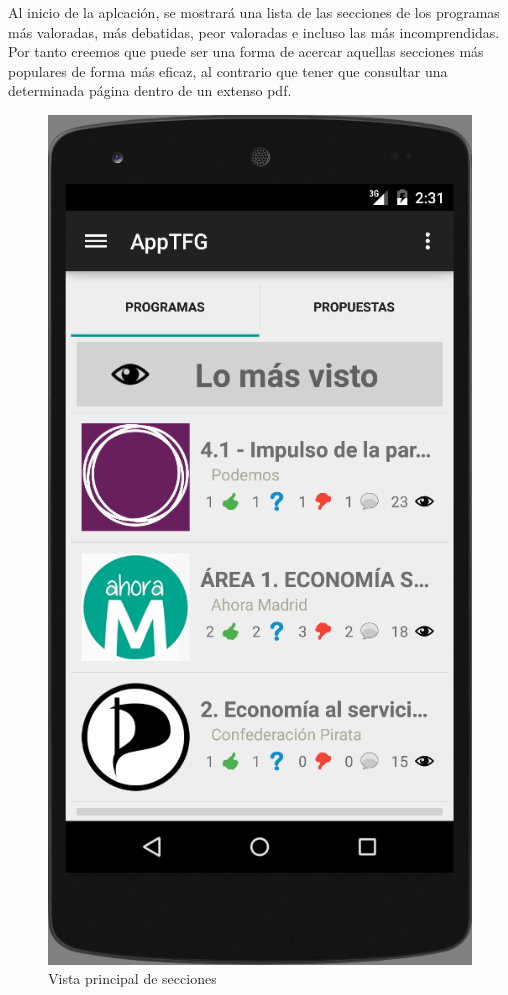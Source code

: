 Al inicio de la aplcación, se mostrará una lista de las secciones de los programas más valoradas, más debatidas, peor valoradas e incluso las más incomprendidas. Por tanto creemos que puede ser una forma de acercar aquellas secciones más populares de forma más eficaz, al contrario que tener que consultar una determinada página dentro de un extenso pdf.

\begin{figure}[H]
\centering
\includegraphics[keepaspectratio, scale=0.5]{Media/Captures/captTopSections.png}
\caption{Vista principal de secciones}
\label{fig:captTopSections}
\end{figure}

